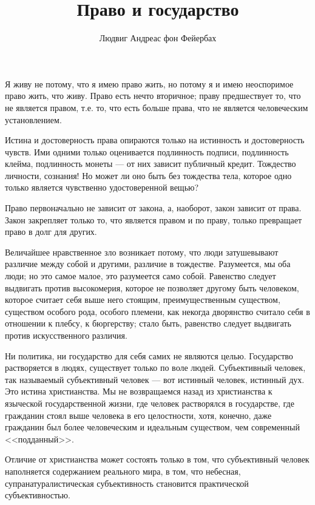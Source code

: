 \documentclass[12pt]{article}
\title{Право и государство}
\author{Людвиг Андреас фон Фейербах}
\date{}
\begin{document}
\maketitle

\newpage

Я живу не потому, что я имею право жить, но потому я и имею неоспоримое право жить, что живу. Право есть нечто вторичное; праву предшествует то, что не является правом, т.е. то, что есть больше права, что не является человеческим установлением.

\bigskip

Истина и достоверность права опираются только на истинность и достоверность чувств. Ими одними только оценивается подлинность подписи, подлинность клейма, подлинность монеты --- от них зависит публичный кредит. Тождество личности, сознания! Но может ли оно быть без тождества тела, которое одно только является чувственно удостоверенной вещью?

\bigskip

Право первоначально не зависит от закона, а, наоборот, закон зависит от права. Закон закрепляет только то, что является правом и по праву, только превращает право в долг для других.

\bigskip

Величайшее нравственное зло возникает потому, что люди затушевывают различие между собой и другими, различие в тождестве. Разумеется, мы оба люди; но это самое малое, это разумеется само собой. Равенство следует выдвигать против высокомерия, которое не позволяет другому быть человеком, которое считает себя выше него стоящим, преимущественным существом, существом особого рода, особого племени, как некогда дворянство считало себя в отношении к плебсу, к бюргерству; стало быть, равенство следует выдвигать против искусственного различия.

\bigskip

Ни политика, ни государство для себя самих не являются целью. Государство растворяется в людях, существует только по воле людей. Субъективный человек, так называемый субъективный человек --- вот истинный человек, истинный дух. Это истина христианства. Мы не возвращаемся назад из христианства к языческой государственной жизни, где человек растворялся в государстве, где гражданин стоял выше человека в его целостности, хотя, конечно, даже гражданин был более человеческим и идеальным существом, чем современный <<подданный>>.

\bigskip

Отличие от христианства может состоять только в том, что субъективный человек наполняется содержанием реального мира, в том, что небесная, супранатуралистическая субъективность становится практической субъективностью.
\end{document}
